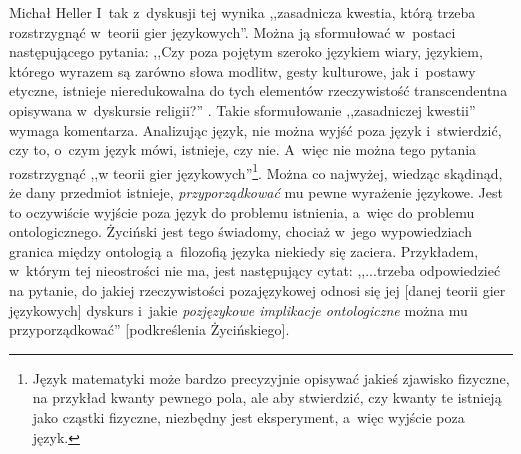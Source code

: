 \begin{artplenv}{Michał Heller}
I~tak z~dyskusji tej wynika ,,zasadnicza kwestia, którą trzeba rozstrzygnąć w~teorii gier językowych''. Można ją sformułować w~postaci następującego pytania: ,,Czy poza pojętym szeroko językiem wiary, językiem, którego wyrazem są zarówno słowa modlitw, gesty kulturowe, jak i~postawy etyczne, istnieje nieredukowalna do tych elementów rzeczywistość transcendentna opisywana w~dyskursie religii?''
\parencite[][s.~16]{zycinski_teizm_1985}. %
 Takie sformułowanie ,,zasadniczej kwestii'' wymaga komentarza. Analizując język, nie można wyjść poza język i~stwierdzić, czy to, o~czym język mówi, istnieje, czy nie. A~więc nie można tego pytania rozstrzygnąć ,,w teorii gier językowych''\footnote{ Język matematyki może bardzo precyzyjnie opisywać jakieś zjawisko fizyczne, na przykład kwanty pewnego pola, ale aby stwierdzić, czy kwanty te istnieją jako cząstki fizyczne, niezbędny jest eksperyment, a~więc wyjście poza język.}. Można co najwyżej, wiedząc skądinąd, że dany przedmiot istnieje, \textit{przyporządkować} mu pewne wyrażenie językowe. Jest to oczywiście wyjście poza język do problemu istnienia, a~więc do problemu ontologicznego. Życiński jest tego świadomy, chociaż w~jego wypowiedziach granica między ontologią a~filozofią języka niekiedy się zaciera. Przykładem, w~którym tej nieostrości nie ma, jest następujący cytat: ,,...trzeba odpowiedzieć na pytanie, do jakiej rzeczywistości pozajęzykowej odnosi się jej [danej teorii gier językowych] dyskurs i~jakie \textit{pozjęzykowe implikacje ontologiczne} można mu przyporządkować'' 
\parencite[][s.~18]{zycinski_teizm_1985}%
[podkreślenia Życińskiego].


\end{artplenv}
